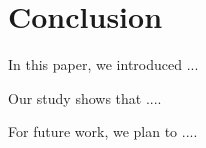 \section{Conclusion}

In this paper, we introduced ... 


Our study shows that .... 

For future work, we plan to ....
